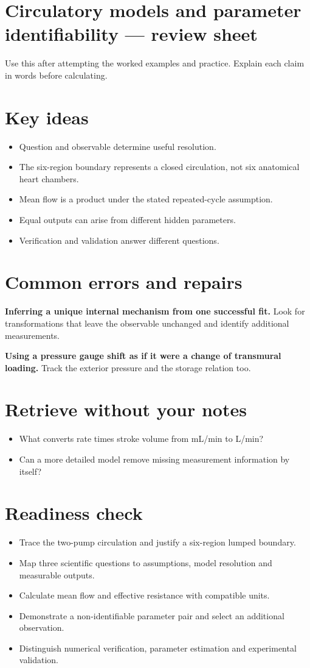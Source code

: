 \documentclass[11pt,letterpaper]{article}
\theoremstyle{definition}\newtheorem{definition}{Definition}\newtheorem{example}{Example}
\numberwithin{equation}{section}
\begin{document}
\section*{Circulatory models and parameter identifiability --- review sheet}
Use this after attempting the worked examples and practice. Explain each claim in words before calculating.

\section*{Key ideas}
\begin{itemize}
\item Question and observable determine useful resolution.
\item The six-region boundary represents a closed circulation, not six anatomical heart chambers.
\item Mean flow is a product under the stated repeated-cycle assumption.
\item Equal outputs can arise from different hidden parameters.
\item Verification and validation answer different questions.
\end{itemize}
\section*{Common errors and repairs}
\textbf{Inferring a unique internal mechanism from one successful fit.} Look for transformations that leave the observable unchanged and identify additional measurements.

\textbf{Using a pressure gauge shift as if it were a change of transmural loading.} Track the exterior pressure and the storage relation too.

\section*{Retrieve without your notes}
\begin{itemize}
\item What converts rate times stroke volume from mL/min to L/min?
\item Can a more detailed model remove missing measurement information by itself?
\end{itemize}
\section*{Readiness check}
\begin{itemize}
\item Trace the two-pump circulation and justify a six-region lumped boundary.
\item Map three scientific questions to assumptions, model resolution and measurable outputs.
\item Calculate mean flow and effective resistance with compatible units.
\item Demonstrate a non-identifiable parameter pair and select an additional observation.
\item Distinguish numerical verification, parameter estimation and experimental validation.
\end{itemize}
\end{document}
